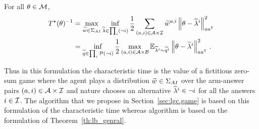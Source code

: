 \begin{lemma}
\label{lem:sion_convexify} For all $\theta\in\mathcal{M}$,
\begin{align*}
  T^{\star}(\theta)^{-1} &= \max_{\widetilde{w} \in \Sigma_{AI}} \inf_{\widetilde{\lambda}\in \prod_i (\neg i) }\frac{1}{2} \sum_{(a,i)\in\mathcal{A}\times\mathcal{I}}\widetilde{w}^{a,i}\left\lVert\theta - \widetilde{\lambda}^i\right\rVert_{aa^{\mathsf{\scriptscriptstyle T}}}^2\\
   &= \inf_{\widetilde{q}\in \prod_i\mathcal{P}(\neg i) } \frac{1}{2}\max_{(a,i)\in\mathcal{A}\times\mathcal{B}}\mathbb{E}_{\widetilde{\lambda}^i\sim \widetilde{q}^i}\left\lVert\theta - \widetilde{\lambda}^i\right\rVert_{aa^{\mathsf{\scriptscriptstyle T}}}^2\,.
\end{align*}
\end{lemma}
Thus in this formulation the characteristic time is the value of a fictitious zero-sum game where the agent plays a distribution $\widetilde{w}\in\Sigma_{AI}$ over the arm-answer pairs $(a,i)\in\mathcal{A}\times\mathcal{I}$ and nature chooses an alternative $\widetilde{\lambda}^i\in\neg i$ for all the answers $i\in\mathcal{I}$. The algorithm \LGC that we propose in Section~\ref{sec:lgc.game} is based on this formulation of the characteristic time whereas algorithm \LG is based on the formulation of Theorem~\ref{th:lb_genral}.

